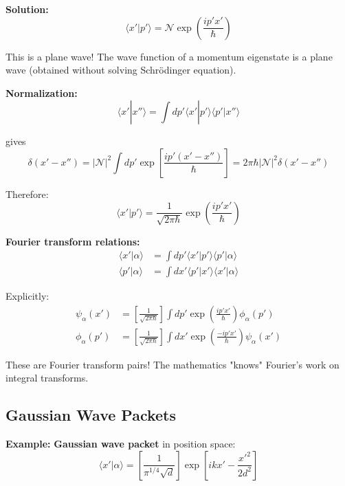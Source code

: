 \documentclass[11pt,a4paper]{article}
\begin{document}
\textbf{Solution:}
\begin{equation}
\boxed{\langle x'|p'\rangle = \mathcal{N}\exp\left(\frac{ip'x'}{\hbar}\right)}
\tag{1.261}
\end{equation}

This is a plane wave! The wave function of a momentum eigenstate is a plane wave (obtained without solving Schrödinger equation).

\textbf{Normalization:}
\begin{equation}
\langle x'|x''\rangle = \int dp'\langle x'|p'\rangle\langle p'|x''\rangle
\tag{1.262}
\end{equation}

gives
\begin{equation}
\delta(x' - x'') = |\mathcal{N}|^2\int dp'\exp\left[\frac{ip'(x' - x'')}{\hbar}\right] = 2\pi\hbar|\mathcal{N}|^2\delta(x' - x'')
\tag{1.263}
\end{equation}

Therefore:
\begin{equation}
\boxed{\langle x'|p'\rangle = \frac{1}{\sqrt{2\pi\hbar}}\exp\left(\frac{ip'x'}{\hbar}\right)}
\tag{1.264}
\end{equation}

\textbf{Fourier transform relations:}
\begin{align}
\langle x'|\alpha\rangle &= \int dp'\langle x'|p'\rangle\langle p'|\alpha\rangle \tag{1.265a} \\
\langle p'|\alpha\rangle &= \int dx'\langle p'|x'\rangle\langle x'|\alpha\rangle \tag{1.265b}
\end{align}

Explicitly:
\begin{align}
\psi_\alpha(x') &= \left[\frac{1}{\sqrt{2\pi\hbar}}\right]\int dp'\exp\left(\frac{ip'x'}{\hbar}\right)\phi_\alpha(p') \tag{1.266a} \\
\phi_\alpha(p') &= \left[\frac{1}{\sqrt{2\pi\hbar}}\right]\int dx'\exp\left(\frac{-ip'x'}{\hbar}\right)\psi_\alpha(x') \tag{1.266b}
\end{align}

These are Fourier transform pairs! The mathematics "knows" Fourier's work on integral transforms.

\subsection{Gaussian Wave Packets}

\textbf{Example:} \textbf{Gaussian wave packet} in position space:
\begin{equation}
\langle x'|\alpha\rangle = \left[\frac{1}{\pi^{1/4}\sqrt{d}}\right]\exp\left[ikx' - \frac{x'^2}{2d^2}\right]
\tag{1.267}
\end{equation}
\end{document}

